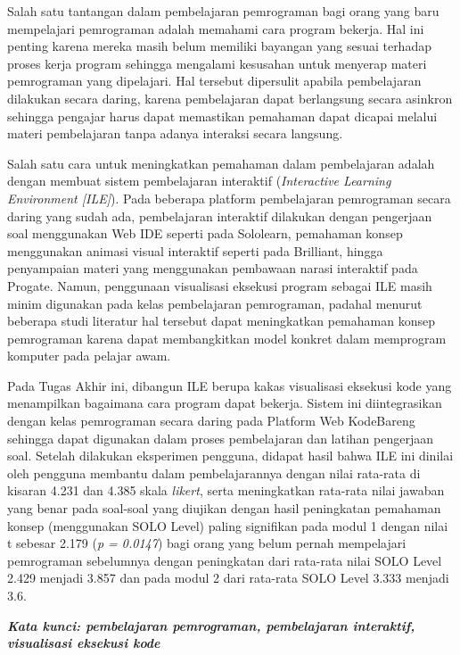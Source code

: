 \begin{singlespace}
  Salah satu tantangan dalam pembelajaran pemrograman bagi orang yang baru mempelajari pemrograman adalah memahami cara program bekerja. Hal ini penting karena mereka masih belum memiliki bayangan yang sesuai terhadap proses kerja program sehingga mengalami kesusahan untuk menyerap materi pemrograman yang dipelajari. Hal tersebut dipersulit apabila pembelajaran dilakukan secara daring, karena pembelajaran dapat berlangsung secara asinkron sehingga pengajar harus dapat memastikan pemahaman dapat dicapai melalui materi pembelajaran tanpa adanya interaksi secara langsung.

  Salah satu cara untuk meningkatkan pemahaman dalam pembelajaran adalah dengan membuat sistem pembelajaran interaktif (\textit{Interactive Learning Environment [ILE]}). Pada beberapa platform pembelajaran pemrograman secara daring yang sudah ada, pembelajaran interaktif dilakukan dengan pengerjaan soal menggunakan Web IDE seperti pada Sololearn, pemahaman konsep menggunakan animasi visual interaktif seperti pada Brilliant, hingga penyampaian materi yang menggunakan pembawaan narasi interaktif pada Progate. Namun, penggunaan visualisasi eksekusi program sebagai ILE masih minim digunakan pada kelas pembelajaran pemrograman, padahal menurut beberapa studi literatur hal tersebut dapat meningkatkan pemahaman konsep pemrograman karena dapat membangkitkan model konkret dalam memprogram komputer pada pelajar awam.

  Pada Tugas Akhir ini, dibangun ILE berupa kakas visualisasi eksekusi kode yang menampilkan bagaimana cara program dapat bekerja. Sistem ini diintegrasikan dengan kelas pemrograman secara daring pada Platform Web KodeBareng sehingga dapat digunakan dalam proses pembelajaran dan latihan pengerjaan soal. Setelah dilakukan eksperimen pengguna, didapat hasil bahwa ILE ini dinilai oleh pengguna membantu dalam pembelajarannya dengan nilai rata-rata di kisaran 4.231 dan 4.385 skala \textit{likert}, serta meningkatkan rata-rata nilai jawaban yang benar pada soal-soal yang diujikan dengan hasil peningkatan pemahaman konsep (menggunakan SOLO Level) paling signifikan pada modul 1 dengan nilai t sebesar 2.179 (\textit{p = 0.0147}) bagi orang yang belum pernah mempelajari pemrograman sebelumnya dengan peningkatan dari rata-rata nilai SOLO Level 2.429 menjadi 3.857 dan pada modul 2 dari rata-rata SOLO Level 3.333 menjadi 3.6.

  \textbf{\textit{Kata kunci: pembelajaran pemrograman, pembelajaran interaktif, visualisasi eksekusi kode}}
\end{singlespace}
\clearpage
